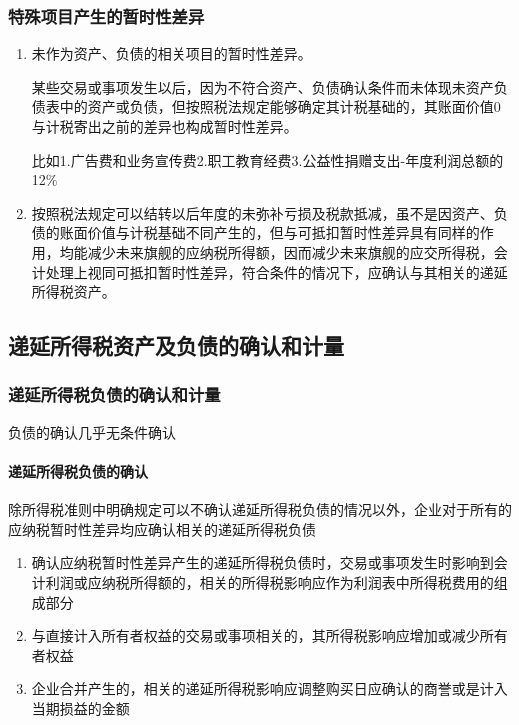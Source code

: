 \documentclass[UTF8,12pt]{ctexart}
\numberwithin{equation}{section} %
\numberwithin{figure}{section}
\numberwithin{table}{section}
\begin{document}
	\subsubsection{特殊项目产生的暂时性差异}
	\begin{enumerate}
		\item 未作为资产、负债的相关项目的暂时性差异。
		
		某些交易或事项发生以后，因为不符合资产、负债确认条件而未体现未资产负债表中的资产或负债，但按照税法规定能够确定其计税基础的，其账面价值0与计税寄出之前的差异也构成暂时性差异。
		
		比如1.广告费和业务宣传费2.职工教育经费3.公益性捐赠支出-年度利润总额的12\%
		
		\item 按照税法规定可以结转以后年度的未弥补亏损及税款抵减，虽不是因资产、负债的账面价值与计税基础不同产生的，但与可抵扣暂时性差异具有同样的作用，均能减少未来旗舰的应纳税所得额，因而减少未来旗舰的应交所得税，会计处理上视同可抵扣暂时性差异，符合条件的情况下，应确认与其相关的递延所得税资产。
	\end{enumerate}
	
	\subsection{递延所得税资产及负债的确认和计量}
	\subsubsection{递延所得税负债的确认和计量}
	负债的确认几乎无条件确认
	\paragraph{递延所得税负债的确认}
	除所得税准则中明确规定可以不确认递延所得税负债的情况以外，企业对于所有的应纳税暂时性差异均应确认相关的递延所得税负债
	
	\begin{enumerate}
		\item 确认应纳税暂时性差异产生的递延所得税负债时，交易或事项发生时影响到会计利润或应纳税所得额的，相关的所得税影响应作为利润表中所得税费用的组成部分
		
		\item 与直接计入所有者权益的交易或事项相关的，其所得税影响应增加或减少所有者权益
		
		\item 企业合并产生的，相关的递延所得税影响应调整购买日应确认的商誉或是计入当期损益的金额
	\end{enumerate}
	
\end{document}
